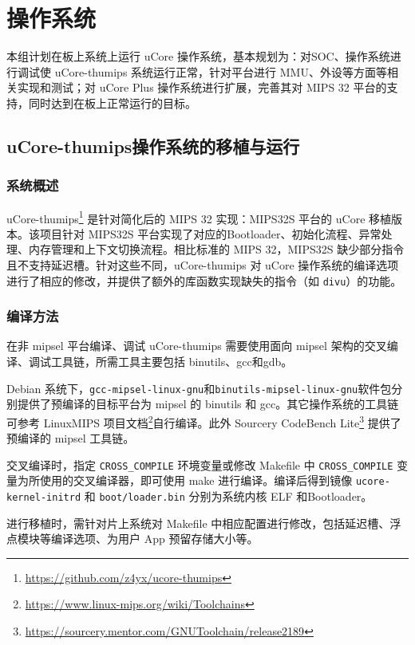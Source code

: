 \chapter{操作系统}
本组计划在板上系统上运行 uCore 操作系统，基本规划为：对SOC、操作系统进行调试使 uCore-thumips 系统运行正常，针对平台进行 MMU、外设等方面等相关实现和测试；对 uCore Plus 操作系统进行扩展，完善其对 MIPS 32 平台的支持，同时达到在板上正常运行的目标。

\section{uCore-thumips操作系统的移植与运行}
\label{section:ucore-thumips}
\subsection{系统概述}

uCore-thumips\footnote{\url{https://github.com/z4yx/ucore-thumips}} 是针对简化后的 MIPS 32 实现：MIPS32S 平台的 uCore 移植版本。该项目针对 MIPS32S 平台实现了对应的Bootloader、初始化流程、异常处理、内存管理和上下文切换流程。相比标准的 MIPS 32，MIPS32S 缺少部分指令且不支持延迟槽。针对这些不同，uCore-thumips 对 uCore 操作系统的编译选项进行了相应的修改，并提供了额外的库函数实现缺失的指令（如 \texttt{divu}）的功能。

\subsection{编译方法}
在非 mipsel 平台编译、调试 uCore-thumips 需要使用面向 mipsel 架构的交叉编译、调试工具链，所需工具主要包括 binutils、gcc和gdb。

Debian 系统下，\texttt{gcc-mipsel-linux-gnu}和\texttt{binutils-mipsel-linux-gnu}软件包分别提供了预编译的目标平台为 mipsel 的 binutils 和 gcc。其它操作系统的工具链可参考 LinuxMIPS 项目文档\footnote{\url{https://www.linux-mips.org/wiki/Toolchains}}自行编译。此外 Sourcery CodeBench Lite\footnote{\url{https://sourcery.mentor.com/GNUToolchain/release2189}} 提供了预编译的 mipsel 工具链。 

交叉编译时，指定 \texttt{CROSS\_COMPILE} 环境变量或修改 Makefile 中 \texttt{CROSS\_COMPILE} 变量为所使用的交叉编译器，即可使用 make 进行编译。编译后得到镜像 \texttt{ucore-kernel-initrd} 和 \texttt{boot/loader.bin} 分别为系统内核 ELF 和Bootloader。

进行移植时，需针对片上系统对 Makefile 中相应配置进行修改，包括延迟槽、浮点模块等编译选项、为用户 App 预留存储大小等。

